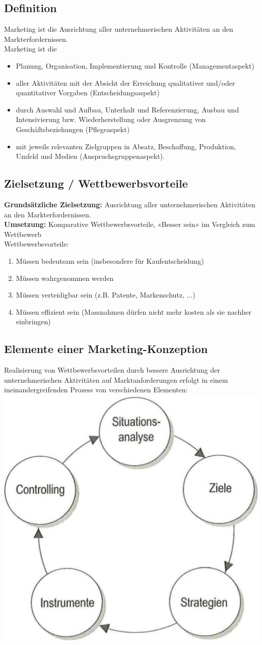\subsection{Definition}
Marketing ist die Ausrichtung aller unternehmerischen Aktivitäten an den Markterfordernissen. \\
Marketing ist die
\begin{itemize}
	\item Planung, Organisation, Implementierung und Kontrolle (Managementaspekt)
	\item aller Aktivitäten mit der Absicht der Erreichung qualitativer und/oder quantitativer Vorgaben (Entscheidungsaspekt)
	\item durch Auswahl und Aufbau, Unterhalt und Referenzierung, Ausbau und Intensivierung bzw. Wiederherstellung oder Ausgrenzung von Geschäftsbeziehungen (Pflegeaspekt)
	\item mit jeweils relevanten Zielgruppen in Absatz, Beschaffung, Produktion, Umfeld und Medien (Anspruchsgruppenaspekt).
\end{itemize}

\subsection{Zielsetzung / Wettbewerbsvorteile}
\textbf{Grundsätzliche Zielsetzung:} Ausrichtung aller unternehmerischen Aktivitäten an den Markterfordernissen. \\
\textbf{Umsetzung:} Komparative Wettbewerbsvorteile, «Besser sein» im Vergleich zum Wettbewerb \\
Wettbewerbsvorteile:
\begin{enumerate}
	\item Müssen bedeutsam sein (insbesondere für Kaufentscheidung)
	\item Müssen wahrgenommen werden
	\item Müssen verteidigbar sein (z.B. Patente, Markenschutz, ...)
	\item Müssen effizient sein (Massnahmen dürfen nicht mehr kosten als sie nachher einbringen)
\end{enumerate}

\subsection{Elemente einer Marketing-Konzeption}
Realisierung von Wettbewerbsvorteilen durch bessere Ausrichtung der unternehmerischen Aktivitäten auf Marktanforderungen erfolgt in einem ineinandergreifenden Prozess von verschiedenen Elementen:\\
\includegraphics[width=0.2\linewidth]{images/elemente_marketing}

